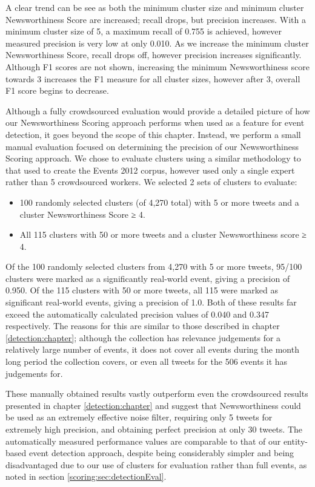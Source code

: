 A clear trend can be see as both the minimum cluster size and minimum cluster Newsworthiness Score are increased; recall drops, but precision increases. With a minimum cluster size of 5, a maximum recall of 0.755 is achieved, however measured precision is very low at only 0.010.
As we increase the minimum cluster Newsworthiness Score, recall drops off, however precision increases significantly.
Although F1 scores are not shown, increasing the minimum Newsworthiness score towards 3 increases the F1 measure for all cluster sizes, however after 3, overall F1 score begins to decrease.

Although a fully crowdsourced evaluation would provide a detailed picture of how our Newsworthiness Scoring approach performs when used as a feature for event detection, it goes beyond the scope of this chapter.
Instead, we perform a small manual evaluation focused on determining the precision of our Newsworthiness Scoring approach.
We chose to evaluate clusters using a similar methodology to that used to create the Events 2012 corpus, however used only a single expert rather than 5 crowdsourced workers.
We selected 2 sets of clusters to evaluate:
\begin{itemize}
	\item 100 randomly selected clusters (of 4,270 total) with 5 or more tweets and a cluster Newsworthiness Score ≥ 4.
	\item All 115 clusters with 50 or more tweets and a cluster Newsworthiness score ≥ 4.
\end{itemize}

Of the 100 randomly selected clusters from 4,270 with 5 or more tweets, 95/100 clusters were marked as a significantly real-world event, giving a precision of 0.950.
Of the 115 clusters with 50 or more tweets, all 115 were marked as significant real-world events, giving a precision of 1.0.
Both of these results far exceed the automatically calculated precision values of 0.040 and 0.347 respectively.
The reasons for this are similar to those described in chapter \ref{detection:chapter}; although the collection has relevance judgements for a relatively large number of events, it does not cover all events during the month long period the collection covers, or even all tweets for the 506 events it has judgements for.

These manually obtained results vastly outperform even the crowdsourced results presented in chapter \ref{detection:chapter} and suggest that Newsworthiness could be used as an extremely effective noise filter, requiring only 5 tweets for extremely high precision, and obtaining perfect precision at only 30 tweets.
The automatically measured performance values are comparable to that of our entity-based event detection approach, despite being considerably simpler and being disadvantaged due to our use of clusters for evaluation rather than full events, as noted in section \ref{scoring:sec:detectionEval}.